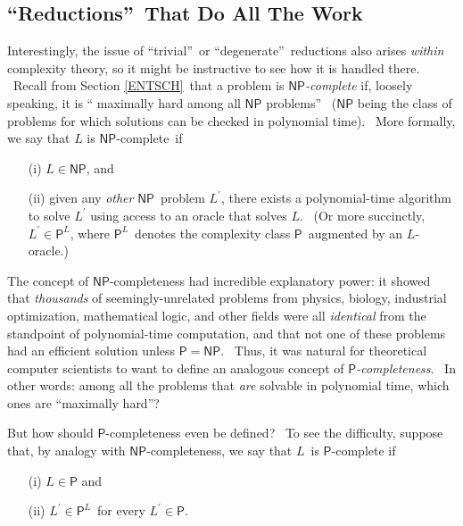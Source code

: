 \documentclass[11pt,onecolumn]{article}%
\begin{document}
\subsection{\textquotedblleft Reductions\textquotedblright\ That Do All The
Work\label{REDUCTIONS}}

Interestingly, the issue of \textquotedblleft trivial\textquotedblright\ or
\textquotedblleft degenerate\textquotedblright\ reductions also arises
\textit{within} complexity theory, so it might be instructive to see how it is
handled there. \ Recall from Section \ref{ENTSCH}\ that a problem is
$\mathsf{NP}$\textit{-complete} if, loosely speaking, it is \textquotedblleft
maximally hard among all $\mathsf{NP}$ problems\textquotedblright%
\ ($\mathsf{NP}$ being the class of problems for which solutions can be
checked in polynomial time). \ More formally, we say that $L$ is $\mathsf{NP}$-complete\ if

\begin{enumerate}
\item[(i)] $L\in\mathsf{NP}$, and

\item[(ii)] given any \textit{other} $\mathsf{NP}$\ problem $L^{\prime}$,
there exists a polynomial-time algorithm to solve $L^{\prime}$ using access to
an oracle that solves $L$. \ (Or more succinctly, $L^{\prime}\in\mathsf{P}%
^{L}$, where $\mathsf{P}^{L}$\ denotes the complexity class $\mathsf{P}%
$\ augmented by an $L$-oracle.)
\end{enumerate}

The concept of $\mathsf{NP}$-completeness had incredible explanatory power: it
showed that \textit{thousands} of seemingly-unrelated problems from physics,
biology, industrial optimization, mathematical logic, and other fields were
all \textit{identical} from the standpoint of polynomial-time computation, and
that not one of these problems had an efficient solution unless $\mathsf{P}%
=\mathsf{NP}$. \ Thus, it was natural for theoretical computer scientists to
want to define an analogous concept of $\mathsf{P}$\textit{-completeness}.
\ In other words: among all the problems that \textit{are} solvable in
polynomial time, which ones are \textquotedblleft maximally
hard\textquotedblright?

But how should $\mathsf{P}$-completeness even be defined? \ To see the
difficulty, suppose that, by analogy with $\mathsf{NP}$-completeness, we say
that $L$\ is $\mathsf{P}$-complete if

\begin{enumerate}
\item[(i)] $L\in\mathsf{P}$ and

\item[(ii)] $L^{\prime}\in\mathsf{P}^{L}$\ for every $L^{\prime}\in\mathsf{P}$.
\end{enumerate}
\end{document}
